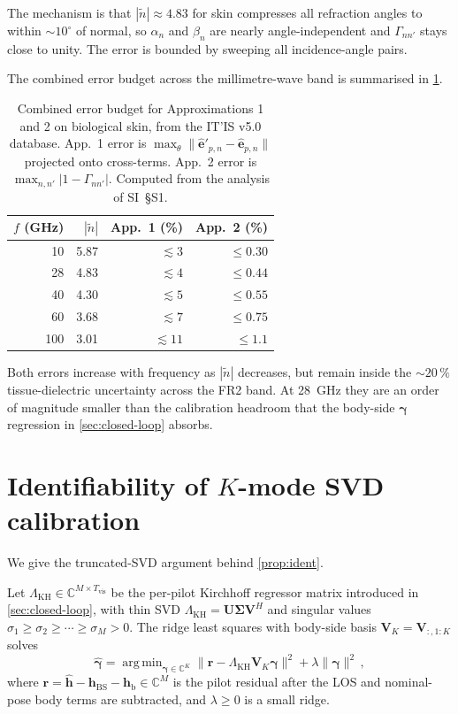 \documentclass[journal,twocolumn,10pt]{IEEEtran}
\theoremstyle{plain}
\theoremstyle{definition}
\theoremstyle{remark}
\newcommand{\hh}{\bm{h}}
\newcommand{\gammab}{\bm{\gamma}}
\newcommand{\hBS}{\bm{h}_{\mathrm{BS}}}
\newcommand{\hbody}{\bm{h}_{\mathrm{b}}}
\newcommand{\Complex}{\mathbb{C}}
\newcommand{\ntilde}{\tilde{n}}
\DeclareMathOperator*{\argmin}{arg\,min}
\begin{document}
The mechanism is that $|\ntilde| \approx 4.83$ for skin compresses
all refraction angles to within $\sim\!10^{\circ}$ of normal, so
$\alpha_n$ and $\beta_n$ are nearly angle-independent and
$\Gamma_{nn'}$ stays close to unity. The error is bounded by
sweeping all incidence-angle pairs.

The combined error budget across the millimetre-wave band is
summarised in \cref{tab:approx-acc}.

\begin{table}[!htbp]
\centering
\caption{Combined error budget for Approximations 1 and 2 on
biological skin, from the IT'IS v5.0 database. App.~1 error is
$\max_\theta \|\hat{\bm{e}}'_{p,n} - \hat{\bm{e}}_{p,n}\|$ projected
onto cross-terms. App.~2 error is $\max_{n,n'}|1 - \Gamma_{nn'}|$.
Computed from the analysis of SI~\S{}S1.}
\label{tab:approx-acc}
\begin{tabular}{rrrr}
\toprule
$f$ (GHz) & $|\ntilde|$ & App.~1 (\%) & App.~2 (\%) \\
\midrule
10  & 5.87 & $\lesssim 3$  & $\leq 0.30$ \\
28  & 4.83 & $\lesssim 4$  & $\leq 0.44$ \\
40  & 4.30 & $\lesssim 5$  & $\leq 0.55$ \\
60  & 3.68 & $\lesssim 7$  & $\leq 0.75$ \\
100 & 3.01 & $\lesssim 11$ & $\leq 1.1$  \\
\bottomrule
\end{tabular}
\end{table}

Both errors increase with frequency as $|\ntilde|$ decreases, but
remain inside the $\sim\!20\,\%$ tissue-dielectric uncertainty across
the FR2 band. At 28~GHz they are an order of magnitude smaller than
the calibration headroom that the body-side $\gammab$ regression in
\cref{sec:closed-loop} absorbs.

\section{Identifiability of $K$-mode SVD calibration}
\label{app:ident}

We give the truncated-SVD argument behind \cref{prop:ident}.

Let $\Lambda_{\mathrm{KH}} \in \Complex^{M \times T_{\mathrm{vis}}}$
be the per-pilot Kirchhoff regressor matrix introduced in
\cref{sec:closed-loop}, with thin SVD
$\Lambda_{\mathrm{KH}} = \bm{U}\bm{\Sigma}\bm{V}^{\!H}$ and singular
values $\sigma_1 \geq \sigma_2 \geq \cdots \geq \sigma_M > 0$. The
ridge least squares with body-side basis
$\bm{V}_K = \bm{V}_{:,1:K}$ solves
\begin{equation}\label{eq:gamma-ridge}
  \hat{\gammab} = \argmin_{\gammab \in \Complex^K}
    \bigl\|\bm{r} - \Lambda_{\mathrm{KH}}\bm{V}_K\gammab\bigr\|^2
  + \lambda \|\gammab\|^2\,,
\end{equation}
where $\bm{r} = \hat{\hh} - \hBS - \hbody \in \Complex^M$ is the
pilot residual after the LOS and nominal-pose body terms are
subtracted, and $\lambda \geq 0$ is a small ridge.
\end{document}
